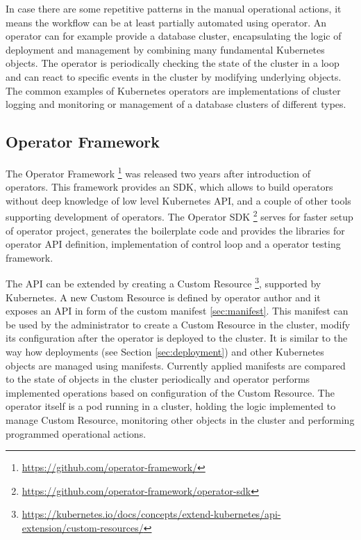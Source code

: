 \documentclass[
  digital, %
  twoside, %
  table,   %
  lof,     %
  lot,     %
]{fithesis3}
\begin{document}
In case there are some repetitive patterns in the manual operational actions, it means the workflow can be at least partially automated using operator. An operator can for example provide a database cluster, encapsulating the logic of deployment and management by combining many fundamental Kubernetes objects. The operator is periodically checking the state of the cluster in a loop and can react to specific events in the cluster by modifying underlying objects. The common examples of Kubernetes operators are implementations of cluster logging and monitoring or management of a database clusters of different types.

\subsection{Operator Framework} \label{sec:operator_framework}
The Operator Framework \footnote{\url{https://github.com/operator-framework/}} was released two years after introduction of operators. This framework provides an SDK, which allows to build operators without deep knowledge of low level Kubernetes API, and a couple of other tools supporting development of operators. The Operator SDK \footnote{\url{https://github.com/operator-framework/operator-sdk}} serves for faster setup of operator project, generates the boilerplate code and provides the libraries for operator API definition, implementation of control loop and a operator testing framework.

The API can be extended by creating a Custom Resource \footnote{\url{https://kubernetes.io/docs/concepts/extend-kubernetes/api-extension/custom-resources/}}, supported by Kubernetes. A new Custom Resource is defined by operator author and it exposes an API in form of the custom manifest \ref{sec:manifest}. This manifest can be used by the administrator to create a Custom Resource in the cluster, modify its configuration after the operator is deployed to the cluster. It is similar to the way how deployments (see Section \ref{sec:deployment}) and other Kubernetes objects are managed using manifests. Currently applied manifests are compared to the state of objects in the cluster periodically and operator performs implemented operations based on configuration of the Custom Resource. The operator itself is a pod running in a cluster, holding the logic implemented to manage Custom Resource, monitoring other objects in the cluster and performing programmed operational actions.
\end{document}
